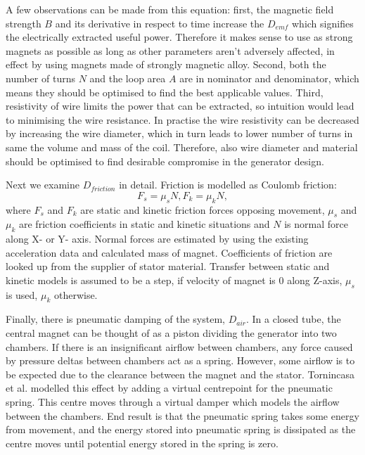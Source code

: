 A few observations can be made from this equation: first, the magnetic field strength $B$ and its derivative in respect to time increase the $D_{emf}$ which signifies the electrically extracted useful power. Therefore it makes sense to use as strong magnets as possible as long as other parameters aren't adversely affected, in effect by using magnets made of strongly magnetic alloy. Second, both the number of turns $N$ and the loop area $A$ are in nominator and denominator, which means they should be optimised to find the best applicable values. Third, resistivity of wire limits the power that can be extracted, so intuition would lead to minimising the wire resistance. In practise the wire resistivity can be decreased by increasing the wire diameter, which in turn leads to lower number of turns in same the volume and mass of the coil. Therefore, also wire diameter and material should be optimised to find desirable compromise in the generator design. 

Next we examine $D_{friction}$ in detail. Friction is modelled as Coulomb friction:
\begin{equation}\label{eq:Coulomb_friction}
  F_s = \mu_sN,
  F_k = \mu_kN,
\end{equation}
where $F_s $ and $ F_k $ are static and kinetic friction forces opposing movement, $\mu_s$ and $\mu_k$ are friction coefficients in static and kinetic situations and $N$ is normal force along X- or Y- axis. Normal forces are estimated by using the existing acceleration data and calculated mass of magnet. Coefficients of friction are looked up from the supplier of stator material. Transfer between static and kinetic models is assumed to be a step, if velocity of magnet is 0 along Z-axis, $\mu_s$ is used, $\mu_k$ otherwise.

Finally, there is pneumatic damping of the system, $D_{air}$. In a closed tube, the central magnet can be thought of as a piston dividing the generator into two chambers. If there is an insignificant airflow between chambers, any force caused by pressure deltas between chambers act as a spring. However, some airflow is to be expected due to the clearance between the magnet and the stator. Tornincasa et al. \cite{Tornincasa2012} modelled this effect by adding a virtual centrepoint for the pneumatic spring. This centre moves through a virtual damper which models the airflow between the chambers. End result is that the pneumatic spring takes some energy from movement, and the energy stored into pneumatic spring is dissipated as the centre moves until potential energy stored in the spring is zero. 

